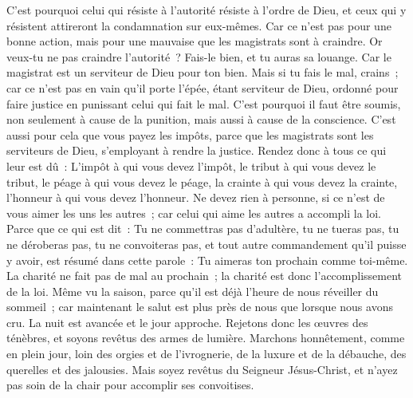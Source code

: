 \begin{multicols}{2}
C'est pourquoi celui qui résiste à l'autorité résiste à l'ordre de Dieu, et ceux qui y résistent attireront la condamnation sur eux-mêmes.
Car ce n'est pas pour une bonne action, mais pour une mauvaise que les magistrats sont à craindre. Or veux-tu ne pas craindre l'autorité~? Fais-le bien, et tu auras sa louange.
Car le magistrat est un serviteur de Dieu pour ton bien. Mais si tu fais le mal, crains~; car ce n'est pas en vain qu'il porte l'épée, étant serviteur de Dieu, ordonné pour faire justice en punissant celui qui fait le mal.
C'est pourquoi il faut être soumis, non seulement à cause de la punition, mais aussi à cause de la conscience.
C'est aussi pour cela que vous payez les impôts, parce que les magistrats sont les serviteurs de Dieu, s'employant à rendre la justice.
Rendez donc à tous ce qui leur est dû~: L'impôt à qui vous devez l'impôt, le tribut à qui vous devez le tribut, le péage à qui vous devez le péage, la crainte à qui vous devez la crainte, l'honneur à qui vous devez l'honneur.
Ne devez rien à personne, si ce n'est de vous aimer les uns les autres~; car celui qui aime les autres a accompli la loi.
Parce que ce qui est dit~: Tu ne commettras pas d'adultère, tu ne tueras pas, tu ne déroberas pas, tu ne convoiteras pas, et tout autre commandement qu'il puisse y avoir, est résumé dans cette parole~: Tu aimeras ton prochain comme toi-même.
La charité ne fait pas de mal au prochain~; la charité est donc l'accomplissement de la loi.
Même vu la saison, parce qu'il est déjà l’heure de nous réveiller du sommeil~; car maintenant le salut est plus près de nous que lorsque nous avons cru.
La nuit est avancée et le jour approche. Rejetons donc les œuvres des ténèbres, et soyons revêtus des armes de lumière.
Marchons honnêtement, comme en plein jour, loin des orgies et de l'ivrognerie, de la luxure et de la débauche, des querelles et des jalousies.
Mais soyez revêtus du Seigneur Jésus-Christ, et n'ayez pas soin de la chair pour accomplir ses convoitises.

\end{multicols}

